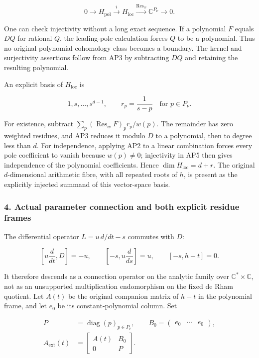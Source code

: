 \documentclass{article}
\begin{document}
\[
0\longrightarrow H_{\mathrm{pol}}\xrightarrow{i}H_{\mathrm{loc}}
\xrightarrow{\operatorname{Res}_w}\mathbb C^{P_\nu}\longrightarrow0.
\tag{AP5}
\]

One can check injectivity without a long exact sequence. If a polynomial \(F\) equals \(DQ\) for rational \(Q\), the leading-pole calculation forces \(Q\) to be a polynomial. Thus no original polynomial cohomology class becomes a boundary. The kernel and surjectivity assertions follow from AP3 by subtracting \(DQ\) and retaining the resulting polynomial.

An explicit basis of \(H_{\mathrm{loc}}\) is

\[
1,s,\ldots,s^{d-1},\qquad r_p=\frac{1}{s-p}
\quad\text{for }p\in P_\nu.
\tag{AP6}
\]

For existence, subtract \(\sum_p (\operatorname{Res}_w F)_p r_p/w(p)\). The remainder has zero weighted residues, and AP3 reduces it modulo \(D\) to a polynomial, then to degree less than \(d\). For independence, applying AP2 to a linear combination forces every pole coefficient to vanish because \(w(p)\ne0\); injectivity in AP5 then gives independence of the polynomial coefficients. Hence \(\dim H_{\mathrm{loc}}=d+r\). The original \(d\)-dimensional arithmetic fibre, with all repeated roots of \(h\), is present as the explicitly injected summand of this vector-space basis.

\subsubsection{4. Actual parameter connection and both explicit residue frames}\label{endpoint-analytic_pole--actual-parameter-connection-and-both-explicit-residue-frames}

The differential operator \(L=u\,d/dt-s\) commutes with \(D\):

\[
\left[u\frac{d}{dt},D\right]=-u,\qquad
\left[-s,u\frac{d}{ds}\right]=u,\qquad [-s,h-t]=0.
\tag{AP7}
\]

It therefore descends as a connection operator on the analytic family over \(\mathbb{C}^{*}\times\mathbb{C}\), not as an unsupported multiplication endomorphism on the fixed de Rham quotient. Let \(A(t)\) be the original companion matrix of \(h-t\) in the polynomial frame, and let \(e_0\) be its constant-polynomial column. Set

\[
\begin{aligned}
P&=\operatorname{diag}(p)_{p\in P_\nu},\qquad
B_0=\begin{pmatrix}e_0&\cdots&e_0\end{pmatrix},\\
A_{\mathrm{ext}}(t)&=\begin{bmatrix}A(t)&B_0\\0&P\end{bmatrix}.
\end{aligned}
\tag{AP8}
\]
\end{document}
